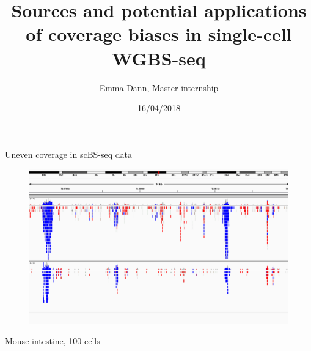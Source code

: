 \documentclass[10pt]{beamer}
\title{Sources and potential applications of coverage biases in single-cell WGBS-seq}
\date{16/04/2018}
\author{Emma Dann, Master internship}
\begin{document}
\begin{frame}
 \titlepage
\end{frame}



\begin{frame}[label=current]{Uneven coverage in scBS-seq data}
  \begin{figure}
    \includegraphics[scale=0.25, trim={0 0 0 16cm}, clip]{purifiedDNA.png}
  \end{figure}
  Mouse intestine, 100 cells
\end{frame}
\end{document}
